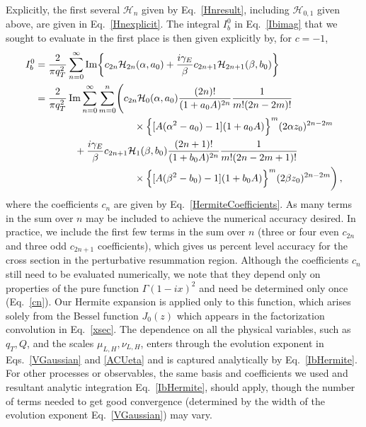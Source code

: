 \documentclass[a4,letterpaper,11pt]{article}
\newcommand{\nn}{\nonumber}
\newcommand{\cH}{\mathcal{H}}
\newcommand{\eq}[1]{Eq.~\eqref{#1}}
\newcommand{\eqs}[2]{Eqs.~\eqref{#1} and \eqref{#2}}
\DeclareMathOperator{\Imag}{Im}
\begin{document}
Explicitly, the first several $\cH_{n}$ given by \eq{Hnresult}, including $\cH_{0,1}$ given above, are given in \eq{Hnexplicit}.
The integral $I_b^0$ in \eq{Ibimag} that we sought to evaluate in the first place is then given explicitly by, for $c=-1$,
\begin{align}
\label{IbHermite}
I_b^0  &= \frac{2}{\pi q_T^2}  \sum_{n=0}^{\infty} 
\Imag \biggl\{    c_{2n} \cH_{2n}(\alpha,a_0) + \frac{i\gamma_E}{\beta} c_{2n+1} \cH_{2n+1}(\beta,b_0)  \biggr\} \\
&= \frac{2}{\pi q_T^2} \Imag \sum_{n=0}^\infty \sum_{m=0}^n \Biggl( c_{2n} \cH_0(\alpha,a_0) \frac{(2n)!}{(1+a_0 A)^{2n}} \frac{1}{m!(2n-2m)!} \nn \\
&\qquad\qquad \qquad \qquad\qquad  \times \Bigl\{ [ A(\alpha^2 - a_0)-1] (1+a_0 A)\Bigr\}^m (2\alpha z_0)^{2n-2m} \nn  \\
&\qquad \qquad + \frac{i\gamma_E}{\beta} c_{2n+1} \cH_1(\beta,b_0) \frac{(2n+1)!}{(1+b_0A)^{2n}} \frac{1}{m!(2n-2m+1)!} \nn \\
&\qquad\qquad \qquad \qquad\qquad  \times \Bigl\{ [ A(\beta^2 - b_0)-1] (1+b_0 A)\Bigr\}^m (2\beta z_0)^{2n-2m}\biggr)\nn
\,,\end{align} 
where the coefficients $c_{n}$ are given by \eq{HermiteCoefficients}. As many terms in the sum over $n$ may be included to achieve the numerical accuracy desired. In practice, we include the first few terms in the sum over $n$ (three or four even $c_{2n}$ and three odd $c_{2n+1}$ coefficients), which gives us percent level accuracy for the cross section in the perturbative resummation region. Although the coefficients $c_{n}$ still need to be evaluated numerically, we note that they depend only on properties of the pure function $\Gamma(1-ix)^2$ and need be determined only once (\eq{cn}). Our Hermite expansion is applied only to this function, which arises solely from the Bessel function $J_0(z)$ which appears in the factorization convolution in \eq{xsec}. The dependence on all the physical variables, such as $q_T,Q$, and the scales $\mu_{L,H},\nu_{L,H}$, enters through the evolution exponent in \eqs{VGaussian}{ACUeta} and is captured analytically by \eq{IbHermite}. For other processes or observables, the same basis and coefficients we used and resultant analytic integration \eq{IbHermite}, should apply, though the number of terms needed to get good convergence (determined by the width of the evolution exponent \eq{VGaussian})  may vary.


\end{document}
